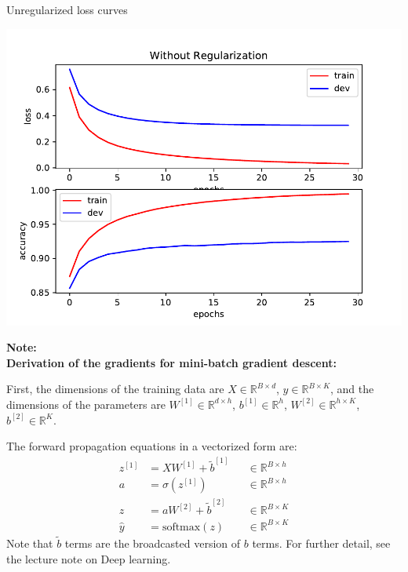 \begin{answer}
Unregularized loss curves

\includegraphics[scale=0.75]{../src/mnist/baseline}

\textbf{Note: \\ Derivation of the gradients for mini-batch gradient descent:}

First, the dimensions of the training data are $X \in \mathbb{R}^{B \times d}$, $y  \in \mathbb{R}^{B \times K}$, and the dimensions of the parameters are $W^{[1]}  \in \mathbb{R}^{d \times h}$, $b^{[1]}  \in \mathbb{R}^{h}$, $W^{[2]}  \in \mathbb{R}^{h \times K}$, $b^{[2]}  \in \mathbb{R}^{K}$.

The forward propagation equations in a vectorized form are:
\begin{align*}
    z^{[1]} &= X W^{[1]} + \tilde{b}^{[1]} &&\in \mathbb{R}^{B \times h}\\
    a &= \sigma \left( z^{[1]} \right) &&\in \mathbb{R}^{B \times h}\\
    z &= a W^{[2]} + \tilde{b}^{[2]} &&\in \mathbb{R}^{B \times K}\\
    \hat{y} &= \text{softmax} \left( z \right) &&\in \mathbb{R}^{B \times K}
\end{align*}
Note that $\tilde{b}$ terms are the broadcasted version of $b$ terms.
For further detail, see the lecture note on Deep learning.


\end{answer}
